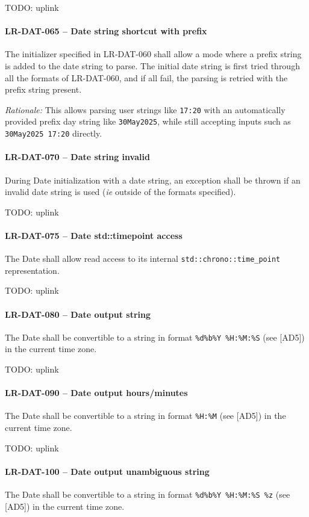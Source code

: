 TODO: uplink

\paragraph{LR-DAT-065 -- Date string shortcut with prefix}
The initializer specified in LR-DAT-060 shall allow a mode where
a prefix string is added to the date string to parse.
The initial date string is first tried through all the formats
of LR-DAT-060, and if all fail, the parsing is retried with
the prefix string present.

\textit{Rationale:} This allows parsing user strings like \lstinline{17:20}
with an automatically provided prefix day string like \lstinline{30May2025},
while still accepting inputs such as \lstinline{30May2025 17:20} directly.

\paragraph{LR-DAT-070 -- Date string invalid}
During Date initialization with a date string, an exception shall be
thrown if an invalid date string is used (\textit{ie} outside of the formats
specified).

TODO: uplink

\paragraph{LR-DAT-075 -- Date std::time\textunderscore point access}
The Date shall allow read access to its internal
\lstinline{std::chrono::time_point} representation.

TODO: uplink

\paragraph{LR-DAT-080 -- Date output string}
The Date shall be convertible to a string in format
\lstinline{%d%b%Y %H:%M:%S} (see [AD5]) in the current time zone.

TODO: uplink
\paragraph{LR-DAT-090 -- Date output hours/minutes}
The Date shall be convertible to a string in format
\lstinline{%H:%M} (see [AD5]) in the current time zone.

TODO: uplink
\paragraph{LR-DAT-100 -- Date output unambiguous string}
The Date shall be convertible to a string in format
\lstinline{%d%b%Y %H:%M:%S %z} (see [AD5]) in the current time zone.

